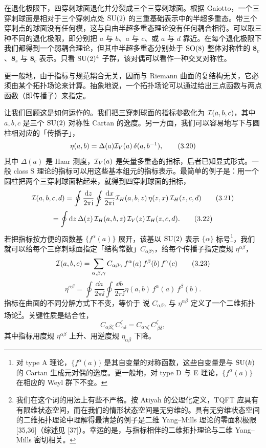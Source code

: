 在退化极限下，四穿刺球面退化并分裂成三个三穿刺球面。根据 Gaiotto，一个三穿刺球面是相对于三个穿刺点处 $\operatorname{SU}(2)$ 的三重基础表示中的半超多重态。带三个穿刺点的球面没有任何模，这与自由半超多重态理论没有任何耦合相符。可以取三种不同的退化极限，即分别把 $a$ 与 $b$、$a$ 与 $c$、或 $a$ 与 $d$ 靠近。在每个退化极限下我们都得到一个弱耦合理论，但其中半超多重态分别处于 $\operatorname{SO}(8)$ 整体对称性的 $\mathbf{8}_v$、$\mathbf{8}_s$ 与 $\mathbf{8}_c$ 表示。只看 $\operatorname{SU}(2)^4$ 子群，该对偶可以看作一种交叉对称性。

更一般地，由于指标与规范耦合无关，因而与 Riemann 曲面的复结构无关，它必须由某个拓扑场论来计算。抽象地说，一个拓扑场论可以通过给出三点函数与两点函数（即传播子）来指定。

让我们回顾这是如何运作的。我们把三穿刺球面的指标参数化为 $\mathcal{I}(a,b,c)$，其中 $a,b,c$ 是三个 $\operatorname{SU}(2)$ 对称性 Cartan 的逸度。另一方面，我们可以容易地写下与圆柱相对应的「传播子」，
\[
\eta(a,b)=\Delta(a)\mathcal{I}_V(a)\,\delta(a,b^{-1}) ,
\tag{3.20}
\]
其中 $\Delta(a)$ 是 Haar 测度，$\mathcal{I}_V(a)$ 是矢量多重态的指标，后者已知显式形式。一般 class S 理论的指标可以用这些基本组元的指标表示。最简单的例子是：用一个圆柱把两个三穿刺球面粘起来，就得到四穿刺球面的指标，
\[
\mathcal{I}(a,b,c,d)=\oint\frac{\mathrm{d} z}{2\pi\mathrm{i}}\oint\frac{\mathrm{d} x}{2\pi\mathrm{i}}\mathcal{I}_H(a,b,z)\,\eta(z,x)\,\mathcal{I}_H(z,c,d)
\tag{3.21}
\]
\[
=\oint\mathrm{d} z\,\Delta(z)\,\mathcal{I}_H(a,b,z)\,\mathcal{I}_V(z)\,\mathcal{I}_H(z,c,d) .
\tag{3.22}
\]
若把指标按方便的函数基 $\{f^\alpha(a)\}$ 展开，该基以 $\operatorname{SU}(2)$ 表示 $\{\alpha\}$ 标号\footnote{对 type A 理论，$\{f^\alpha(a)\}$ 是其自变量的对称函数，这些自变量是与 $\operatorname{SU}(k)$ 的 Cartan 生成元对偶的逸度。更一般地，对 type D 与 E 理论，$\{f^\alpha(a)\}$ 在相应的 Weyl 群下不变。}，我们就可以给每个三穿刺球面指定「结构常数」$C_{\alpha\beta\gamma}$，给每个传播子指定度规 $\eta^{\alpha\beta}$，
\[
\mathcal{I}(a,b,c)=\sum_{\alpha,\beta,\gamma}C_{\alpha\beta\gamma}\,f^\alpha(a)\,f^\beta(b)\,f^\gamma(c)
\tag{3.23}
\]
\[
\eta^{\alpha\beta}=\oint\frac{\dd a}{2\pi\ii}\oint\frac{\dd b}{2\pi\ii}\eta(a,b)\,f^\alpha(a)\,f^\beta(b) .
\tag{3.24}
\]
指标在曲面的不同分解方式下不变，等价于
说 $C_{\alpha\beta\gamma}$ 与 $\eta^{\alpha\beta}$ 定义了一个二维拓扑场论\footnote{我们在这个词的用法上有些不严格。按 Atiyah 的公理化定义，TQFT 应具有有限维状态空间，而在我们的情形状态空间是无穷维的。具有无穷维状态空间的二维拓扑理论中理解得最清楚的例子是二维 Yang–Mills 理论的零面积极限 [35,36]（综述见 [37]）。幸运的是，与指标相伴的二维拓扑理论与二维 Yang–Mills 密切相关。}。关键性质是结合性，
\[
C_{\alpha\beta\zeta}\,C^{\zeta}_{\ \gamma\delta}=C_{\alpha\gamma\zeta}\,C^{\zeta}_{\ \beta\delta} ,
\tag{3.25}
\]
其中指标用度规 $\eta^{\alpha\beta}$ 上升、用逆度规 $\eta_{\alpha\beta}$ 下降。

